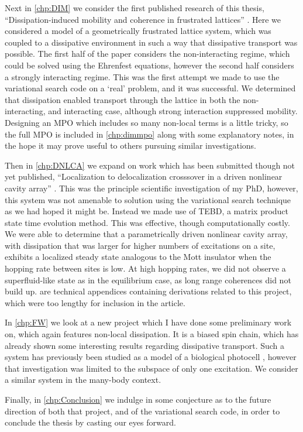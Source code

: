 Next in \cref{chp:DIM} we consider the first published research of this thesis, ``Dissipation-induced mobility and coherence in frustrated lattices'' \cite{Owen2017}. Here we considered a model of a geometrically frustrated lattice system, which was coupled to a dissipative environment in such a way that dissipative transport was possible. The first half of the paper considers the non-interacting regime, which could be solved using the Ehrenfest equations, however the second half considers a strongly interacting regime. This was the first attempt we made to use the variational search code on a `real' problem, and it was successful. We determined that dissipation enabled transport through the lattice in both the non-interacting, and interacting case, although strong interaction suppressed mobility. Designing an MPO which includes so many non-local terms is a little tricky, so the full MPO is included in \cref{chp:dimmpo} along with some explanatory notes, in the hope it may prove useful to others pursuing similar investigations.

Then in \cref{chp:DNLCA} we expand on work which has been submitted though not yet published, ``Localization to delocalization crosssover in a driven nonlinear cavity array'' \cite{Brown2018}. This was the principle scientific investigation of my PhD, however, this system was not amenable to solution using the variational search technique as we had hoped it might be. Instead we made use of TEBD, a matrix product state time evolution method. This was effective, though computationally costly. We were able to determine that a parametrically driven nonlinear cavity array, with dissipation that was larger for higher numbers of excitations on a site, exhibits a localized steady state analogous to the Mott insulator when the hopping rate between sites is low. At high hopping rates, we did not observe a superfluid-like state as in the equilibrium case, as long range coherences did not build up.  are technical appendices containing derivations related to this project, which were too lengthy for inclusion in the article.

In \cref{chp:FW} we look at a new project which I have done some preliminary work on, which again features non-local dissipation. It is a biased spin chain, which has already shown some interesting results regarding dissipative transport. Such a system has previously been studied as a model of a biological photocell \cite{Fruchtman2016}, however that investigation was limited to the subspace of only one excitation. We consider a similar system in the many-body context. 

Finally, in \cref{chp:Conclusion} we indulge in some conjecture as to the future direction of both that project, and of the variational search code, in order to conclude the thesis by casting our eyes forward. 